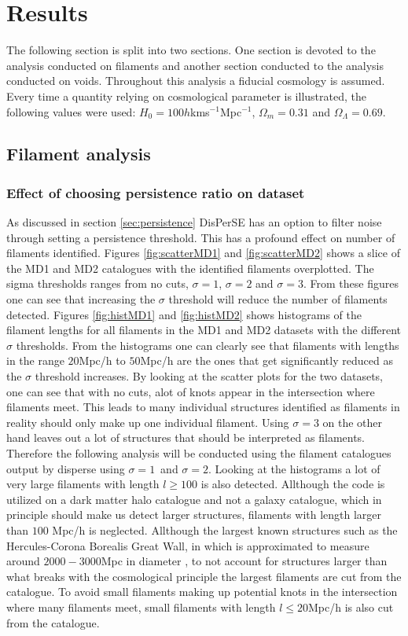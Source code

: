 \chapter{Results}
The following section is split into two sections. One section is devoted to the analysis conducted on filaments and another section conducted to the analysis conducted on voids. Throughout this analysis a fiducial cosmology is assumed. Every time a quantity relying on cosmological parameter is illustrated, the following values were used: $H_0=100h$kms$^{-1}$Mpc$^{-1}$, $\Omega_m=0.31$ and $\Omega_\Lambda=0.69$.
\section{Filament analysis}

\subsection{Effect of choosing persistence ratio on dataset}
As discussed in section \ref{sec:persistence} DisPerSE has an option to filter
noise through setting a persistence threshold. This has a profound effect on number of filaments identified. Figures \ref{fig:scatterMD1} and \ref{fig:scatterMD2} shows a slice of the MD1 and MD2 catalogues with the identified filaments overplotted. The sigma thresholds ranges from no cuts, $\sigma=1$, $\sigma=2$ and $\sigma=3$. From these figures one can see that increasing the $\sigma$ threshold will reduce the number of filaments detected. Figures \ref{fig:histMD1} and \ref{fig:histMD2} shows histograms of the filament lengths for all filaments in the MD1 and MD2 datasets with the different $\sigma$ thresholds. From the histograms one can clearly see that filaments with lengths in the range $20$Mpc/h to $50$Mpc/h are the ones that get significantly reduced as the $\sigma$ threshold increases. By looking at the scatter plots for the two datasets, one can see that with no cuts, alot of knots appear in the intersection where filaments meet. This leads to many individual structures identified as filaments in reality should only make up one individual filament. Using $\sigma=3$ on the other hand leaves out a lot of structures that should be interpreted as filaments. Therefore the following analysis will be conducted using the filament catalogues output by disperse using $\sigma=1$ and $\sigma=2$. Looking at the histograms a lot of very large filaments with length $l\geq 100$ is also detected. Allthough the code is utilized on a dark matter halo catalogue and not a galaxy catalogue, which in principle should make us detect larger structures, filaments with length larger than $100$ Mpc/h is neglected. Allthough the largest known structures such as the Hercules-Corona Borealis Great Wall, in which is approximated to measure around $2000-3000$Mpc in diameter \cite{herculescorona}, to not account for structures larger than what breaks with the cosmological principle the largest filaments are cut from the catalogue. To avoid small filaments making up potential knots in the intersection where many filaments meet, small filaments with length $l\leq 20$Mpc/h is also cut from the catalogue.
